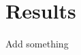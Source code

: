 \documentclass[../thesis.tex]{subfiles}
\begin{document}
\chapter{Results}
\label{chap:results}

Add something
\end{document}
